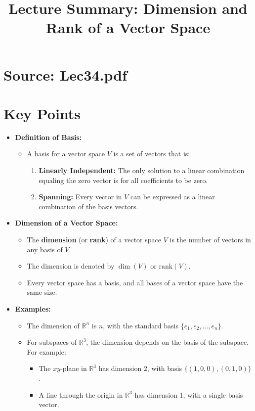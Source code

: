 \documentclass{article}
\title{Lecture Summary: Dimension and Rank of a Vector Space}
\author{}
\date{}
\begin{document}
\maketitle

\section*{Source: Lec34.pdf}

\section*{Key Points}

\begin{itemize}
  \item \textbf{Definition of Basis:}
    \begin{itemize}
      \item A basis for a vector space $V$ is a set of vectors that is:
        \begin{enumerate}
          \item \textbf{Linearly Independent:} The only solution to a linear combination equaling the zero vector is for all coefficients to be zero.
          \item \textbf{Spanning:} Every vector in $V$ can be expressed as a linear combination of the basis vectors.
        \end{enumerate}
    \end{itemize}

  \item \textbf{Dimension of a Vector Space:}
    \begin{itemize}
      \item The \textbf{dimension} (or \textbf{rank}) of a vector space $V$ is the number of vectors in any basis of $V$.
      \item The dimension is denoted by $\dim(V)$ or $\text{rank}(V)$.
      \item Every vector space has a basis, and all bases of a vector space have the same size.
    \end{itemize}

  \item \textbf{Examples:}
    \begin{itemize}
      \item The dimension of $\mathbb{R}^n$ is $n$, with the standard basis $\{e_1, e_2, \dots, e_n\}$.
      \item For subspaces of $\mathbb{R}^3$, the dimension depends on the basis of the subspace. For example:
        \begin{itemize}
          \item The $xy$-plane in $\mathbb{R}^3$ has dimension 2, with basis $\{(1, 0, 0), (0, 1, 0)\}$.
          \item A line through the origin in $\mathbb{R}^3$ has dimension 1, with a single basis vector.
        \end{itemize}
    \end{itemize}


\end{itemize}
\end{document}
